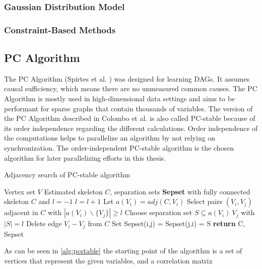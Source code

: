 \subsubsection{Gaussian Distribution Model}


\subsubsection{Constraint-Based Methods}



\subsection{PC Algorithm}
The PC Algorithm (Spirtes et al. \cite{spirtesCausationPredictionSearch1993}) was designed for learning DAGs. It assumes causal sufficiency, which means there are no unmeasured common causes. The PC Algorithm is mostly used in high-dimensional data settings and aims to be performant for sparse graphs that contain thousands of variables. \cite{kalisch_understanding_2010}
The version of the PC Algorithm described in Colombo et al. \cite{colomboOrderIndependentConstraintBasedCausal} is also called PC-stable because of its order independence regarding the different calculations. Order independence of the computations helps to parallelize an algorithm by not relying on synchronization. The order-independent PC-stable algorithm is the chosen algorithm for later parallelizing efforts in this thesis.

\begin{algorithm}
    \caption{Adjacency search of PC-stable algorithm \cite{colomboOrderIndependentConstraintBasedCausal}}
    \label{alg:pcstable}
    \begin{algorithmic}[1]
    \Require Vertex set $V$
    \Ensure Estimated skeleton $C$, separation sets \textbf{Sepset}
    \State with fully connected skeleton $C$ and $l = -1$
    \Repeat 
        \State $l=l+1$
            \State Let $a(V_i) = adj(C,V_i)$
        \EndFor
        \Repeat
            \State Select pairs $(V_i,V_j)$ adjacent in $C$ with $|a(V_i)\backslash\{V_j\}| \geq l$
            \Repeat
                \State Choose separation set $S \subseteq a(V_i ) \ {V_j }$ with $| S | = l$
                    \State Delete edge $V_i - V_j$ from $C$
                    \State Set Sepset(i,j) = Sepset(j,i) = S
                \EndIf
    \State \textbf{return} C, Sepset
    \end{algorithmic}
\end{algorithm}

As can be seen in \ref{alg:pcstable} the starting point of the algorithm is a set of vertices that represent the given variables, and a correlation matrix 
